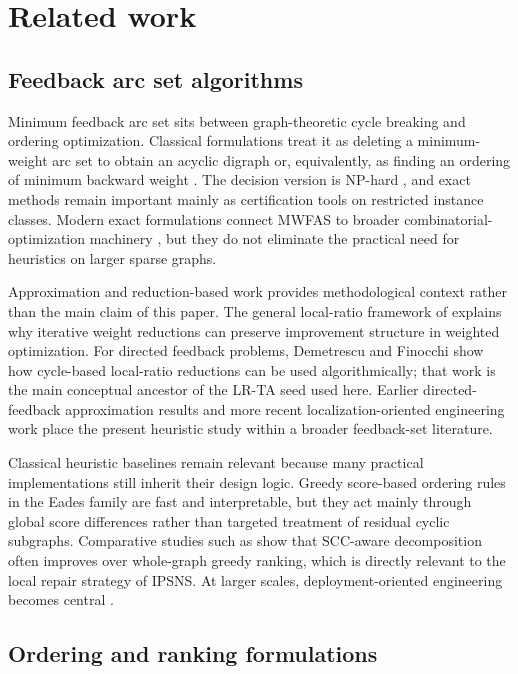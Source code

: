 \section{Related work}
\label{sec:related-work}

\subsection{Feedback arc set algorithms}

Minimum feedback arc set sits between graph-theoretic cycle breaking and ordering optimization. Classical formulations treat it as deleting a minimum-weight arc set to obtain an acyclic digraph or, equivalently, as finding an ordering of minimum backward weight \cite{LC66,F90}. The decision version is NP-hard \cite{K72}, and exact methods remain important mainly as certification tools on restricted instance classes. Modern exact formulations connect MWFAS to broader combinatorial-optimization machinery \cite{BSNA21}, but they do not eliminate the practical need for heuristics on larger sparse graphs.

Approximation and reduction-based work provides methodological context rather than the main claim of this paper. The general local-ratio framework of \cite{BYGR98} explains why iterative weight reductions can preserve improvement structure in weighted optimization. For directed feedback problems, Demetrescu and Finocchi \cite{DF03} show how cycle-based local-ratio reductions can be used algorithmically; that work is the main conceptual ancestor of the LR-TA seed used here. Earlier directed-feedback approximation results \cite{ENSS98} and more recent localization-oriented engineering work \cite{HGH21} place the present heuristic study within a broader feedback-set literature.

Classical heuristic baselines remain relevant because many practical implementations still inherit their design logic. Greedy score-based ordering rules in the Eades family \cite{ELS93,EL95} are fast and interpretable, but they act mainly through global score differences rather than targeted treatment of residual cyclic subgraphs. Comparative studies such as \cite{BH13} show that SCC-aware decomposition often improves over whole-graph greedy ranking, which is directly relevant to the local repair strategy of IPSNS. At larger scales, deployment-oriented engineering becomes central \cite{SST16}.

\subsection{Ordering and ranking formulations}

